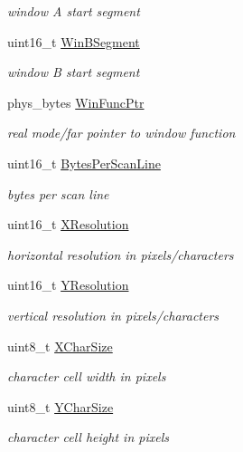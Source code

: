\begin{DoxyCompactItemize}
\begin{DoxyCompactList}\small\item\em window A start segment \end{DoxyCompactList}\item 
uint16\+\_\+t \hyperlink{struct____attribute_____a6dbaac9ee1cae36ca0c7b46559264b69}{Win\+B\+Segment}
\begin{DoxyCompactList}\small\item\em window B start segment \end{DoxyCompactList}\item 
phys\+\_\+bytes \hyperlink{struct____attribute_____aa211c2411f48f899b0bb0739ecef0b37}{Win\+Func\+Ptr}
\begin{DoxyCompactList}\small\item\em real mode/far pointer to window function \end{DoxyCompactList}\item 
uint16\+\_\+t \hyperlink{struct____attribute_____a3c9eb4b107ecee102c6e63f9054ede06}{Bytes\+Per\+Scan\+Line}
\begin{DoxyCompactList}\small\item\em bytes per scan line \end{DoxyCompactList}\item 
uint16\+\_\+t \hyperlink{struct____attribute_____abe48e2b29aa99e813a1447d22711f4f4}{X\+Resolution}
\begin{DoxyCompactList}\small\item\em horizontal resolution in pixels/characters \end{DoxyCompactList}\item 
uint16\+\_\+t \hyperlink{struct____attribute_____aa91385451d974d9c33978062e22d39e2}{Y\+Resolution}
\begin{DoxyCompactList}\small\item\em vertical resolution in pixels/characters \end{DoxyCompactList}\item 
uint8\+\_\+t \hyperlink{struct____attribute_____acac41a300563737d7849a92cd1d5c10b}{X\+Char\+Size}
\begin{DoxyCompactList}\small\item\em character cell width in pixels \end{DoxyCompactList}\item 
uint8\+\_\+t \hyperlink{struct____attribute_____acb93d86860efea5c87e3c2950f39123e}{Y\+Char\+Size}
\begin{DoxyCompactList}\small\item\em character cell height in pixels \end{DoxyCompactList}\item 

\end{DoxyCompactItemize}
